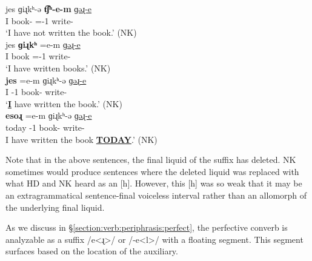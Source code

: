 \begin{exe}
	\ex \label{sent:MorphoPhono:Liq:NonConst:Shift}
	\begin{xlist}
		
		\ex \gll jes  ɡiɻkʰ-ə \textbf{t͡ʃʰ\colorbox{lsLightGray}{-e-m}}  \uline{{ɡəɻ-e}}  
		\\
		I  book-{}    {\neggloss}={\auxgloss}-1{\sg} write-{\perfcvb}
		\\
		\trans `I have not written  the book.' \label{ex:phonosyntax:perf:move:neg} \hfill (NK)
		\\
		\ex \gll jes  \textbf{ɡiɻkʰ} \colorbox{lsLightGray}{=e-m}  \uline{{ɡəɻ-e}}  
		\\
		I  book    ={\auxgloss}-1{\sg} write-{\perfcvb}
		\\
		\trans `I have written  books.'   \label{ex:phonosyntax:perf:move:bare}\hfill (NK)
		\\
		\ex \gll \textbf{jes} \colorbox{lsLightGray}{=e-m}  ɡiɻkʰ-ə     \uline{{ɡəɻ-e}}  
		\\
		I  {\auxgloss}-1{\sg} book-{}     write-{\perfcvb}
		\\
		\trans `\textbf{\uline{I}} have  written  the book.' \label{ex:phonosyntax:perf:move:foc1}\hfill (NK)
		\\
		\ex \gll \textbf{esoɻ} \colorbox{lsLightGray}{=e-m}  ɡiɻkʰ-ə     \uline{{ɡəɻ-e}}  
		\\
		today   {\auxgloss}-1{\sg} book-{}     write-{\perfcvb}
		\\
		\trans I have  written  the book \textbf{\uline{TODAY}}.'  \label{ex:phonosyntax:perf:move:foc2}\hfill (NK)
		\\
	\end{xlist}
\end{exe}

Note that in the above sentences, the final liquid of the suffix has deleted. NK sometimes would produce sentences where    the deleted liquid was replaced with   what HD and NK heard as an [h]. However, this [h]  was so weak that it may be an extragrammatical sentence-final voiceless interval rather than an allomorph of the underlying final liquid.

As we discuss   in \S\ref{section:verb:periphrasis:perfect}, the perfective converb is analyzable as a suffix /e<ɻ>/ or /-e<l>/ with a floating segment. This segment surfaces based on the location of the auxiliary. 

